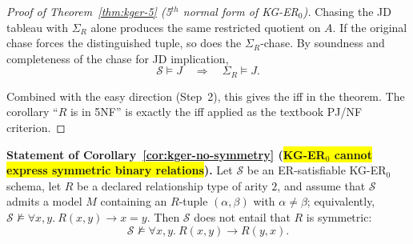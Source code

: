\documentclass[10pt]{article}
\begin{document}
\begin{proof}[Proof of Theorem~\ref{thm:kger-5} (5$^{th}$ normal form of KG-ER$_0$)]
Chasing the JD tableau with \(\Sigma_R\) alone produces the same
restricted quotient on \(A\).  If the original chase forces the
distinguished tuple, so does the \(\Sigma_R\)-chase.  By soundness and
completeness of the chase for JD implication,
\[
\mathcal S\models J \quad\Longrightarrow\quad \Sigma_R\models J.
\]

Combined with the easy direction (Step~2), this gives the iff in the
theorem.  The corollary ``\(R\) is in 5NF'' is exactly the iff applied
as the textbook PJ/NF criterion.
\end{proof}

\noindent\textbf{Statement of Corollary~\ref{cor:kger-no-symmetry} (\colorbox{yellow}{KG-ER$_0$ cannot express symmetric binary relations}).}
Let \(\mathcal S\) be an ER-satisfiable KG-ER\(_0\) schema, let
\(R\) be a declared relationship type of arity \(2\), and assume that
\(\mathcal S\) admits a model \(M\) containing an \(R\)-tuple
\((\alpha,\beta)\) with \(\alpha\neq\beta\); equivalently,
\(\mathcal S\not\models\forall x,y.\ R(x,y)\to x=y\).
Then \(\mathcal S\) does not entail that \(R\) is symmetric:
\[
\mathcal S\not\models \forall x,y.\ R(x, y) \rightarrow R(y, x).
\]
\end{document}
